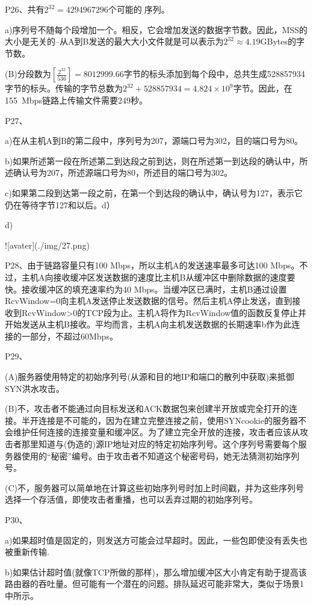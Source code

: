\documentclass[11pt,UTF8,twoside]{article}
\begin{document}
	P26、共有$2^{32}= 4294967296$个可能的序列。
	
	a)序列号不随每个段增加一个。相反，它会增加发送的数据字节数。因此，MSS的大小是无关的--从A到B发送的最大大小文件就是可以表示为$2^{32}≈4.19$GBytes的字节数。
	
	(B)分段数为$\left [ \frac{2^{32}}{536} \right ]=8012999$.66字节的标头添加到每个段中，总共生成528857934字节的标头。传输的字节总数为$2^{32}+528857934=4.824\times10^9$字节。因此，在155~Mbps链路上传输文件需要249秒。
	
	P27、
	
	a)在从主机A到B的第二段中，序列号为207，源端口号为302，目的端口号为80。
	
	b)如果所述第一段在所述第二到达段之前到达，则在所述第一到达段的确认中，所述确认号为207，所述源端口号为80，所述目的端口号为302。
	
	c)如果第二段到达第一段之前，在第一个到达段的确认中，确认号为127，表示它仍在等待字节127和以后。d）
	
	d)
	
	![avater](./img/27.png)
	
	P28、由于链路容量只有100 Mbps，所以主机A的发送速率最多可达100 Mbps。不过，主机A向接收缓冲区发送数据的速度比主机B从缓冲区中删除数据的速度要快。接收缓冲区的填充速率约为40 Mbps。当缓冲区已满时，主机B通过设置RcvWindow=0向主机A发送停止发送数据的信号。然后主机A停止发送，直到接收到RcvWindow>0的TCP段为止。主机A将作为RcvWindow值的函数反复停止并开始发送从主机B接收。平均而言，主机A向主机发送数据的长期速率b作为此连接的一部分，不超过60Mbps。
	
	P29、
	
	(A)服务器使用特定的初始序列号(从源和目的地IP和端口的散列中获取)来抵御SYN洪水攻击。
	
	(B)不，攻击者不能通过向目标发送和ACK数据包来创建半开放或完全打开的连接。半开连接是不可能的，因为在建立完整连接之前，使用SYNcookie的服务器不会维护任何连接的连接变量和缓冲区。为了建立完全开放的连接，攻击者应该从攻击者那里知道与(伪造的)源IP地址对应的特定初始序列号。这个序列号需要每个服务器使用的“秘密”编号。由于攻击者不知道这个秘密号码，她无法猜测初始序列号。
	
	(C)不，服务器可以简单地在计算这些初始序列号时加上时间戳，并为这些序列号选择一个存活值，即使攻击者重播，也可以丢弃过期的初始序列号。
	
	P30、
	
	a)如果超时值是固定的，则发送方可能会过早超时。因此，一些包即使没有丢失也被重新传输.
	
	b)如果估计超时值(就像TCP所做的那样)，那么增加缓冲区大小肯定有助于提高该路由器的吞吐量。但可能有一个潜在的问题。排队延迟可能非常大，类似于场景1中所示。
	
\end{document}
